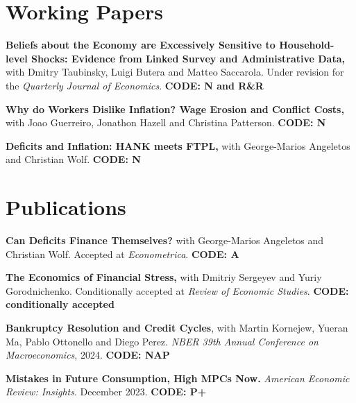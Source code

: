 \documentclass[line]{res}
\newenvironment{list1}{
  \begin{list}{\ding{113}}{%
      \setlength{\itemsep}{0.07in}
      \setlength{\parsep}{0in} \setlength{\parskip}{0in}
		\setlength{\topsep}{0.07in} \setlength{\partopsep}{0in} 
      \setlength{\leftmargin}{0.0in}}}{\end{list}}
\begin{document}
\begin{resume}
\section{\sc Working Papers} 
 \begin{list1}
\item[] \textbf{Beliefs about the Economy are Excessively Sensitive to Household-level Shocks: Evidence from Linked Survey and Administrative Data,} with Dmitry Taubinsky, Luigi Butera and Matteo Saccarola. Under revision for the \emph{Quarterly Journal of Economics}. \textbf{CODE: N and R\&R}
\vspace{0.2cm}
\item[] \textbf{Why do Workers Dislike Inflation? Wage Erosion and Conflict Costs,} with Joao Guerreiro, Jonathon Hazell and Christina Patterson. \textbf{CODE: N}
\vspace{0.2cm}

\item[] \textbf{Deficits and Inflation: HANK meets FTPL,} with George-Marios Angeletos and Christian Wolf.  \textbf{CODE: N}
\end{list1}

\section{Publications}

\begin{list1}

\item[] \textbf{Can Deficits Finance Themselves?} with George-Marios Angeletos and Christian Wolf. Accepted at \emph{Econometrica}. 
\vspace{0.2cm} \textbf{CODE:  A}

\item[] \textbf{The Economics of Financial Stress,} with Dmitriy Sergeyev and Yuriy Gorodnichenko. Conditionally accepted at \emph{Review of Economic Studies}. \textbf{CODE:  conditionally accepted}
\vspace{0.2cm}

\item[] \textbf{Bankruptcy Resolution and Credit Cycles}, with Martin Kornejew, Yueran Ma, Pablo Ottonello and Diego Perez. \emph{NBER 39th Annual Conference on Macroeconomics}, 2024. \textbf{CODE:  NAP}
\vspace{0.2cm}

\item[] \textbf{Mistakes in Future Consumption, High MPCs Now.} \emph{American Economic Review: Insights}. December 2023.  
\textbf{CODE:  P+}
\vspace{0.2cm}


\end{list1}
\end{resume}
\end{document}
